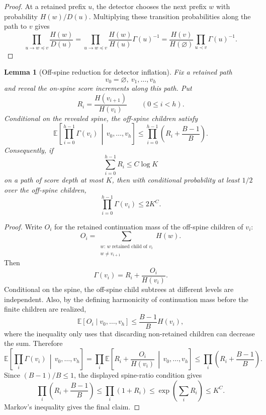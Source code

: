 \documentclass[10pt]{article}
\newtheorem{lemma}[theorem]{Lemma}
\theoremstyle{definition}
\newcommand{\E}{\mathbb{E}}
\begin{document}
\begin{proof}
   At a retained prefix $u$, the detector chooses the next prefix $w$ with probability $H(w)/D(u)$. Multiplying these transition probabilities along the path to $v$ gives
   \[
      \prod_{u\to w\preceq v}\frac{H(w)}{D(u)}
      =
      \prod_{u\to w\preceq v}
      \frac{H(w)}{H(u)}\Gamma(u)^{-1}
      =
      \frac{H(v)}{H(\varnothing)}
      \prod_{u\prec v}\Gamma(u)^{-1}.
   \]
\end{proof}

\begin{lemma}[Off-spine reduction for detector inflation]\label{lem:off-spine-inflation}
   Fix a retained path
   \[
      v_0=\varnothing,\ v_1,\ldots,v_h
   \]
   and reveal the on-spine score increments along this path. Put
   \[
      R_i=\frac{H(v_{i+1})}{H(v_i)}
      \qquad (0\le i<h).
   \]
   Conditional on the revealed spine, the off-spine children satisfy
   \[
      \E\!\left[
         \prod_{i=0}^{h-1}\Gamma(v_i)
         \,\middle|\, v_0,\ldots,v_h
      \right]
      \le
      \prod_{i=0}^{h-1}\left(R_i+\frac{B-1}{B}\right).
   \]
   Consequently, if
   \[
      \sum_{i=0}^{h-1} R_i\le C\log K
   \]
   on a path of score depth at most $K$, then with conditional probability at least $1/2$ over the off-spine children,
   \[
      \prod_{i=0}^{h-1}\Gamma(v_i)\le 2K^C .
   \]
\end{lemma}

\begin{proof}
   Write $O_i$ for the retained continuation mass of the off-spine children of $v_i$:
   \[
      O_i=\sum_{\substack{w:\,w\text{ retained child of }v_i\\w\ne v_{i+1}}}H(w).
   \]
   Then
   \[
      \Gamma(v_i)=R_i+\frac{O_i}{H(v_i)}.
   \]
   Conditional on the spine, the off-spine child subtrees at different levels are independent. Also, by the defining harmonicity of continuation mass before the finite children are realized,
   \[
      \E[O_i\mid v_0,\ldots,v_h]
      \le
      \frac{B-1}{B}H(v_i),
   \]
   where the inequality only uses that discarding non-retained children can decrease the sum. Therefore
   \[
      \E\!\left[
         \prod_i\Gamma(v_i)
         \,\middle|\, v_0,\ldots,v_h
      \right]
      =
      \prod_i
      \E\!\left[
         R_i+\frac{O_i}{H(v_i)}
         \,\middle|\, v_0,\ldots,v_h
      \right]
      \le
      \prod_i\left(R_i+\frac{B-1}{B}\right).
   \]
   Since $(B-1)/B\le1$, the displayed spine-ratio condition gives
   \[
      \prod_i\left(R_i+\frac{B-1}{B}\right)
      \le
      \prod_i(1+R_i)
      \le
      \exp\!\left(\sum_iR_i\right)
      \le
      K^C.
   \]
   Markov's inequality gives the final claim.
\end{proof}
\end{document}
